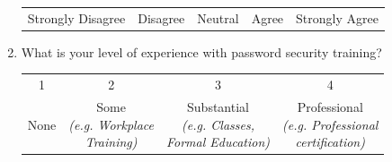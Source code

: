 \documentclass[letterpaper, 10 pt, conference]{ieeeconf}  %
\begin{document}
\begin{enumerate}
\begin{table}[!htbp]
\begin{center}
\begin{tabular}{ccccc}
        Strongly Disagree & Disagree & Neutral & Agree & Strongly Agree
        \end{tabular}
        \end{center}
        \end{table}
    \item What is your level of experience with password security training?
        \begin{table}[!htbp]
        \begin{center}
        \begin{tabular}{cccc}
        1                 & 2        & 3       & 4   \\
        None & \makecell{Some \\ \textit{(e.g. Workplace} \\\textit{Training)}} & \makecell{Substantial \\ \textit{(e.g. Classes,} \\ \textit{Formal Education)}} & \makecell{Professional \\ \textit{(e.g. Professional} \\ \textit{certification)}}
        \end{tabular}
        \end{center}
        \end{table}
        
        \addtolength{\textheight}{-15.5cm}   %
        \newpage{}

        
        

\end{enumerate}
\end{document}
